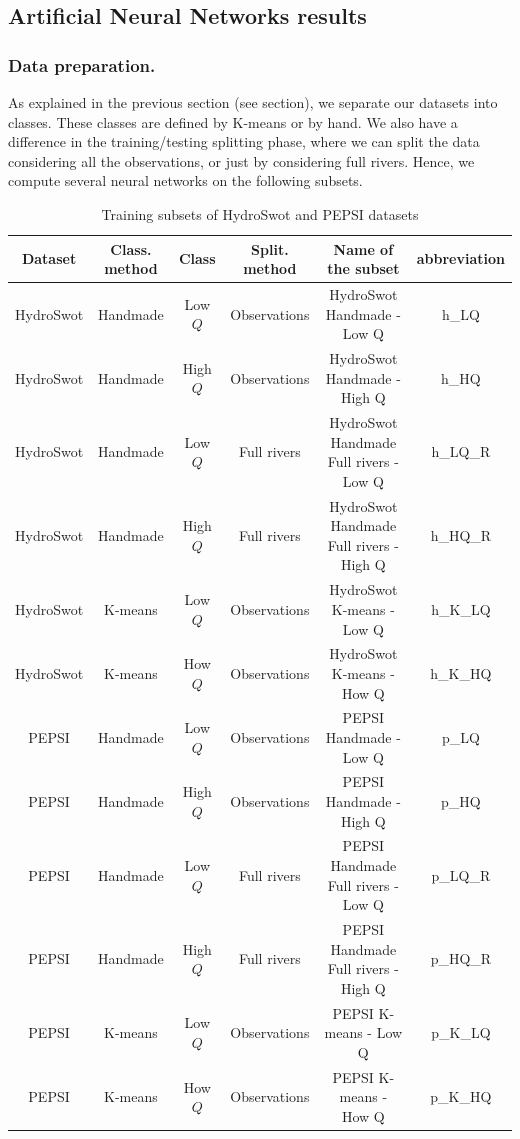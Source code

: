 \subsection{Artificial Neural Networks results}

\subsubsection{Data preparation.\label{section411}}

As explained in the previous section (see  section), we separate our datasets into classes. These classes are defined by K-means or by hand. We also have a difference in the training/testing splitting phase, where we can split the data considering all the observations, or just by considering full rivers. Hence, we compute several neural networks on the following subsets.

\begin{table}[H]
    \centering
    \begin{adjustbox}{max width=\textwidth}
    \begin{tabular}{|c|c|c|c|c|c|}
    \hline
        Dataset & Class. method & Class & Split. method & Name of the subset & abbreviation\\ \hline \hline
        HydroSwot & Handmade & Low $Q$ & Observations & HydroSwot Handmade - Low Q & h\_LQ\\ \hline
        HydroSwot & Handmade & High $Q$ & Observations & HydroSwot Handmade - High Q &h\_HQ\\ \hline
        HydroSwot & Handmade & Low $Q$ & Full rivers & HydroSwot Handmade Full rivers - Low Q &h\_LQ\_R\\ \hline
        HydroSwot & Handmade & High $Q$ & Full rivers & HydroSwot Handmade Full rivers - High Q& h\_HQ\_R\\ \hline
        HydroSwot & K-means & Low $Q$ & Observations & HydroSwot K-means - Low Q &h\_K\_LQ\\ \hline
        HydroSwot & K-means & How $Q$ & Observations & HydroSwot K-means - How Q &h\_K\_HQ\\ \hline
        PEPSI & Handmade & Low $Q$ & Observations & PEPSI Handmade - Low Q& p\_LQ\\ \hline
        PEPSI & Handmade & High $Q$ & Observations & PEPSI Handmade - High Q& p\_HQ\\ \hline
        PEPSI & Handmade & Low $Q$ & Full rivers & PEPSI Handmade Full rivers - Low Q&p\_LQ\_R\\ \hline
        PEPSI & Handmade & High $Q$ & Full rivers & PEPSI Handmade Full rivers - High Q&p\_HQ\_R\\ \hline
        PEPSI & K-means & Low $Q$ & Observations & PEPSI K-means - Low Q&p\_K\_LQ\\ \hline
        PEPSI & K-means & How $Q$ & Observations & PEPSI K-means - How Q&p\_K\_HQ\\ \hline
    \end{tabular}
    \end{adjustbox}
    \caption{Training subsets of HydroSwot and PEPSI datasets}
    \label{tab:classes}
\end{table}

